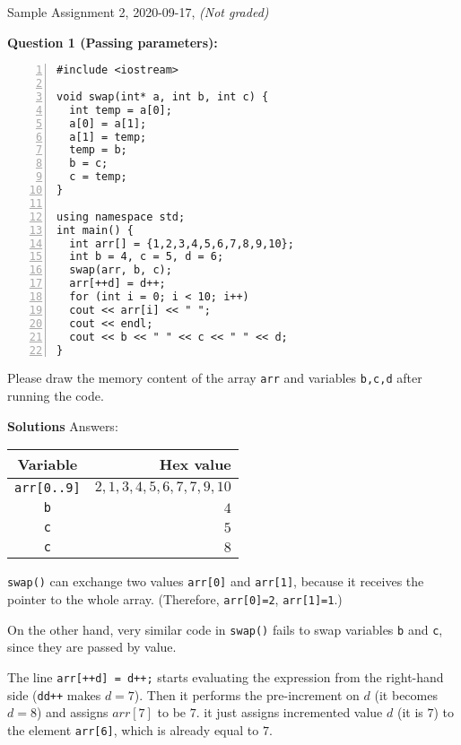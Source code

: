 \documentclass[11pt]{article}
\begin{document}
\thispagestyle{empty}

\twocolumn



\begin{center}
{\Large Sample Assignment 2, 2020-09-17},
{\em (Not graded)}
\end{center}

\vspace{10pt}
{\bf Question 1 (Passing parameters):} 


{\footnotesize
\begin{center}
\begin{minipage}{.85\columnwidth}
\begin{Verbatim}[frame=single,numbers=left]
#include <iostream>

void swap(int* a, int b, int c) {
  int temp = a[0];
  a[0] = a[1];
  a[1] = temp;
  temp = b; 
  b = c;
  c = temp;
}

using namespace std;
int main() {
  int arr[] = {1,2,3,4,5,6,7,8,9,10};
  int b = 4, c = 5, d = 6;
  swap(arr, b, c);
  arr[++d] = d++;
  for (int i = 0; i < 10; i++)
  cout << arr[i] << " ";
  cout << endl;
  cout << b << " " << c << " " << d;
}
\end{Verbatim}
\end{minipage}
\end{center}
}

Please draw the memory content of the array {\tt arr}
and variables {\tt b,c,d} 
after running the code.


\newpage

{\bf \Large Solutions} Answers:\\[10pt]

\begin{tabular}{|c|r|} \hline
{\bf Variable} & {\bf Hex value} \\ \hline
{\tt arr[0..9]} & $2,1,3,4,5,6,7,7,9,10$ \\ \hline
{\tt b} & $4$ \\ \hline
{\tt c} & $5$ \\ \hline
{\tt c} & $8$ \\ \hline
\end{tabular}

{\tt swap()} can exchange two values {\tt arr[0]} and {\tt arr[1]}, because it receives the pointer 
to the whole array. (Therefore, {\tt arr[0]=2}, {\tt arr[1]=1}.)

On the other hand, very similar code in {\tt swap()} fails to swap variables {\tt b} and {\tt c}, 
since they are passed by value.

The line {\tt arr[++d] = d++;} starts evaluating the expression from the right-hand side
({\tt dd++} makes $d=7$). Then it performs the pre-increment on $d$ (it becomes $d=8$) and assigns $arr[7]$ to be $7$.  it just assigns incremented value $d$ (it is $7$)
to the element {\tt arr[6]}, which is already equal to $7$. 
\end{document}
